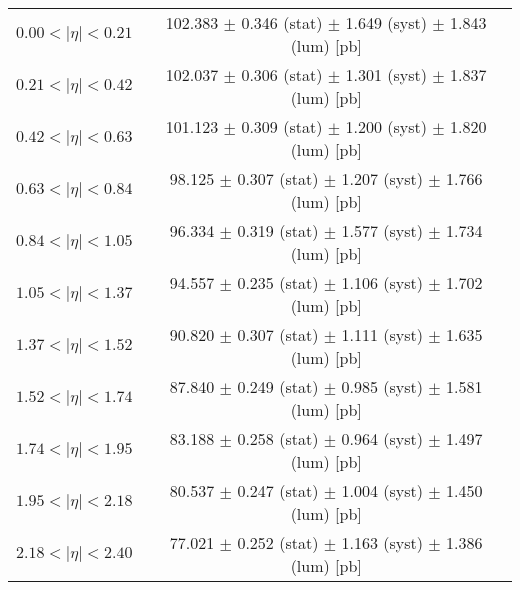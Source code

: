 \begin{tabular}{lc}
\hline
$0.00 < |\eta| <0.21$          & 102.383 $\pm$ 0.346 (stat) $\pm$ 1.649 (syst) $\pm$ 1.843 (lum) [pb]  \\
$0.21 < |\eta| <0.42$          & 102.037 $\pm$ 0.306 (stat) $\pm$ 1.301 (syst) $\pm$ 1.837 (lum) [pb]  \\
$0.42 < |\eta| <0.63$          & 101.123 $\pm$ 0.309 (stat) $\pm$ 1.200 (syst) $\pm$ 1.820 (lum) [pb]  \\
$0.63 < |\eta| <0.84$          & 98.125 $\pm$ 0.307 (stat) $\pm$ 1.207 (syst) $\pm$ 1.766 (lum) [pb]  \\
$0.84 < |\eta| <1.05$          & 96.334 $\pm$ 0.319 (stat) $\pm$ 1.577 (syst) $\pm$ 1.734 (lum) [pb]  \\
$1.05 < |\eta| <1.37$          & 94.557 $\pm$ 0.235 (stat) $\pm$ 1.106 (syst) $\pm$ 1.702 (lum) [pb]  \\
$1.37 < |\eta| <1.52$          & 90.820 $\pm$ 0.307 (stat) $\pm$ 1.111 (syst) $\pm$ 1.635 (lum) [pb]  \\
$1.52 < |\eta| <1.74$          & 87.840 $\pm$ 0.249 (stat) $\pm$ 0.985 (syst) $\pm$ 1.581 (lum) [pb]  \\
$1.74 < |\eta| <1.95$          & 83.188 $\pm$ 0.258 (stat) $\pm$ 0.964 (syst) $\pm$ 1.497 (lum) [pb]  \\
$1.95 < |\eta| <2.18$          & 80.537 $\pm$ 0.247 (stat) $\pm$ 1.004 (syst) $\pm$ 1.450 (lum) [pb]  \\
$2.18 < |\eta| <2.40$          & 77.021 $\pm$ 0.252 (stat) $\pm$ 1.163 (syst) $\pm$ 1.386 (lum) [pb]  \\
\hline
\end{tabular}
